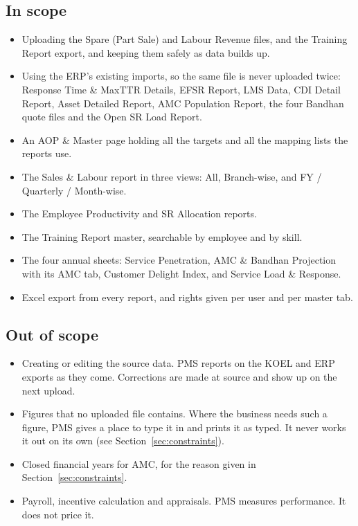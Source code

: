 \documentclass[11pt,a4paper]{article}
\begin{document}
\subsection*{In scope}
\begin{itemize}
  \item Uploading the Spare (Part Sale) and Labour Revenue files, and the Training Report
  export, and keeping them safely as data builds up.
  \item Using the ERP's existing imports, so the same file is never uploaded twice:
  Response Time \& MaxTTR Details, EFSR Report, LMS Data, CDI Detail Report, Asset
  Detailed Report, AMC Population Report, the four Bandhan quote files and the Open SR
  Load Report.
  \item An AOP \& Master page holding all the targets and all the mapping lists the
  reports use.
  \item The Sales \& Labour report in three views: All, Branch-wise, and FY / Quarterly /
  Month-wise.
  \item The Employee Productivity and SR Allocation reports.
  \item The Training Report master, searchable by employee and by skill.
  \item The four annual sheets: Service Penetration, AMC \& Bandhan Projection with its
  AMC tab, Customer Delight Index, and Service Load \& Response.
  \item Excel export from every report, and rights given per user and per master tab.
\end{itemize}

\subsection*{Out of scope}
\begin{itemize}
  \item Creating or editing the source data. PMS reports on the KOEL and ERP exports as
  they come. Corrections are made at source and show up on the next upload.
  \item Figures that no uploaded file contains. Where the business needs such a figure,
  PMS gives a place to type it in and prints it as typed. It never works it out on its own
  (see Section~\ref{sec:constraints}).
  \item Closed financial years for AMC, for the reason given in
  Section~\ref{sec:constraints}.
  \item Payroll, incentive calculation and appraisals. PMS measures performance. It does
  not price it.
\end{itemize}
\end{document}
